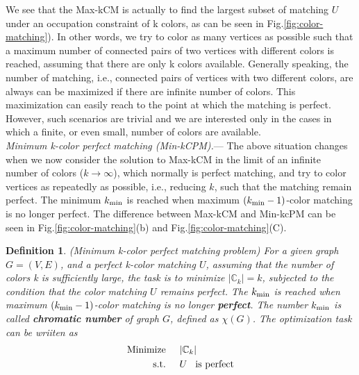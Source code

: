 \documentclass[%
 reprint,
nofootinbib,
 amsmath,amssymb,
 aps,
floatfix,
]{revtex4-2}
\newtheorem{definition}{Definition}
\begin{document}
We see that the Max-kCM is actually to find the largest subset of matching $U$ under an occupation constraint of k colors, as can be seen in Fig.\ref{fig:color-matching}). In other words, we try to color as many vertices as possible such that a maximum number of connected pairs of two vertices with different colors is reached, assuming that there are only k colors available. Generally speaking, the number of matching, i.e., connected pairs of vertices with two different colors, are always can be maximized if there are infinite number of colors. This maximization can easily reach to the point at which the matching is perfect. However, such scenarios are trivial and we are interested only in the cases in which a finite, or even small, number of colors are available.\\

\emph{Minimum k-color perfect matching {\rm (Min-kCPM)}.}---  The above situation changes when we now consider the solution to Max-kCM in the limit of an infinite number of colors ($k \to \infty$), which normally is perfect matching, and try to color vertices as repeatedly as possible, i.e., reducing $k$,  such that the matching remain perfect. The minimum $k_{\rm min}$ is reached when maximum $(k_{\rm min}-1)$-color matching is no longer perfect. The difference between Max-kCM and Min-kcPM can be seen in Fig.\ref{fig:color-matching}(b) and Fig.\ref{fig:color-matching}(C).
\begin{definition}
\label{def:minimum-k-color-perfect-matching-problem}
{\rm (Minimum k-color perfect matching problem)} For a given graph $G=(V,E)$, and a perfect k-color matching $U$, assuming that the number of colors k is sufficiently large, the task is to minimize $|\mathbb{C}_k| = k$, subjected to the condition that the color matching $U$ remains perfect. The $k_{\rm min}$ is reached when maximum $(k_{\rm min}-1)$-color matching is no longer {\rm \textbf{perfect}}. The number $k_{\rm min}$ is called {\rm \textbf{chromatic number}} of graph $G$, defined as $\chi(G)$. The optimization task can be wriiten as 
\begin{align}\label{eq-min-kcpm}
\text{\rm Minimize} \hspace{5mm} &|\mathbb{C}_k|  \nonumber \\
\text{\rm s.t.} \hspace{5mm} &U \hspace{3mm} \text{\rm is perfect}
\end{align}
\end{definition}
\end{document}
